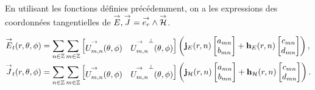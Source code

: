     En utilisant les fonctions définies précédemment, on a les expressions des coordonnées tangentielles de \({\overset{\rightarrow}{E}},{\overset{\rightarrow}{J}} = {\overset{\rightarrow}{e_r}}\wedge{\overset{\rightarrow}{\mathcal{H}}}\).
    \begin{prop}
        \label{prop:imp_fourier:sphere:Et}
     \begin{align*}
            {\overset{\rightarrow}{E}}_t(r,\theta,\phi) &= \sum_{n\in\mathbb Z}\sum_{m\in\mathbb Z}
            \begin{bmatrix}
              {\overset{\rightarrow}{U_{m,n}^{{}}}}(\theta,\phi) & {\overset{\rightarrow}{U_{m,n}^{{}}}}^\perp(\theta,\phi)
            \end{bmatrix}
            \left(
              \mathbf{j}_E(r,n)
              \begin{bmatrix}
                  a_{mn}
                  \\
                  b_{mn}
              \end{bmatrix}
              +
              \mathbf{h}_E(r,n)
              \begin{bmatrix}
                  c_{mn}
                  \\
                  d_{mn}
              \end{bmatrix}
            \right),
            \\
            {\overset{\rightarrow}{J}}_t(r,\theta,\phi) &= \sum_{n\in\mathbb Z}\sum_{m\in\mathbb Z}
            \begin{bmatrix}
                {\overset{\rightarrow}{U_{m,n}^{{}}}}(\theta,\phi) & {\overset{\rightarrow}{U_{m,n}^{{}}}}^\perp(\theta,\phi)
            \end{bmatrix}
            \left(
                \mathbf{j}_{\mathcal{H}}(r,n)
                \begin{bmatrix}
                    a_{mn}
                    \\
                    b_{mn}
                \end{bmatrix}
                +
                \mathbf{h}_{\mathcal{H}}(r,n)
                \begin{bmatrix}
                    c_{mn}
                    \\
                    d_{mn}
                \end{bmatrix}
            \right).
        \end{align*}
    \end{prop}

